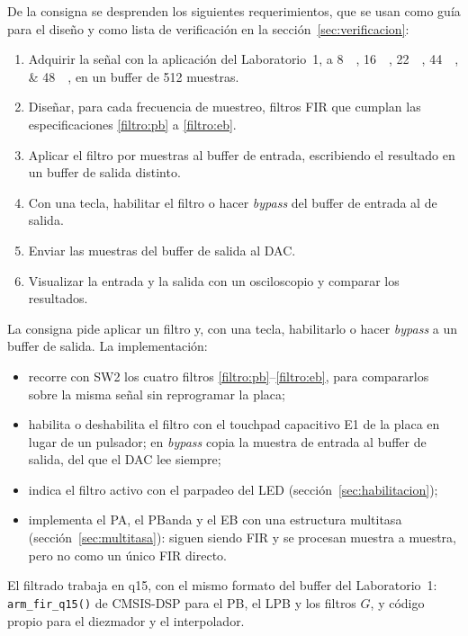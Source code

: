 \documentclass[11pt,a4paper]{article}
\begin{document}
De la consigna se desprenden los siguientes requerimientos, que se usan como
guía para el diseño y como lista de verificación en la
sección~\ref{sec:verificacion}:

\begin{enumerate}[label=\textbf{R\arabic*},leftmargin=2.2em]
  \item \label{req:fs} Adquirir la señal con la aplicación del
        Laboratorio~1, a \qtylist{8;16;22;44;48}{\kilo\sps}, en un buffer de
        512 muestras.
  \item \label{req:diseno} Diseñar, para cada frecuencia de muestreo, filtros
        FIR que cumplan las especificaciones \ref{filtro:pb} a
        \ref{filtro:eb}.
  \item \label{req:cmsis} Aplicar el filtro por muestras al buffer de
        entrada, escribiendo el resultado en un buffer de salida distinto.
  \item \label{req:tecla-filtro} Con una tecla, habilitar el filtro o hacer
        \emph{bypass} del buffer de entrada al de salida.
  \item \label{req:dac} Enviar las muestras del buffer de salida al DAC.
  \item \label{req:osc} Visualizar la entrada y la salida con un osciloscopio
        y comparar los resultados.
\end{enumerate}

\begin{nota}
La consigna pide aplicar un filtro y, con una tecla, habilitarlo o hacer
\emph{bypass} a un buffer de salida. La implementación:
\begin{itemize}[nosep]
  \item recorre con SW2 los cuatro filtros \ref{filtro:pb}--\ref{filtro:eb},
        para compararlos sobre la misma señal sin reprogramar la placa;
  \item habilita o deshabilita el filtro con el touchpad capacitivo E1 de la
        placa en lugar de un pulsador; en \emph{bypass} copia la muestra de
        entrada al buffer de salida, del que el DAC lee siempre;
  \item indica el filtro activo con el parpadeo del LED
        (sección~\ref{sec:habilitacion});
  \item implementa el PA, el PBanda y el EB con una estructura multitasa
        (sección~\ref{sec:multitasa}): siguen siendo FIR y se procesan
        muestra a muestra, pero no como un único FIR directo.
\end{itemize}
El filtrado trabaja en q15, con el mismo formato del buffer del
Laboratorio~1: \texttt{arm\_fir\_q15()} de CMSIS-DSP para el PB, el LPB y
los filtros $G$, y código propio para el diezmador y el interpolador.
\end{nota}
\end{document}

